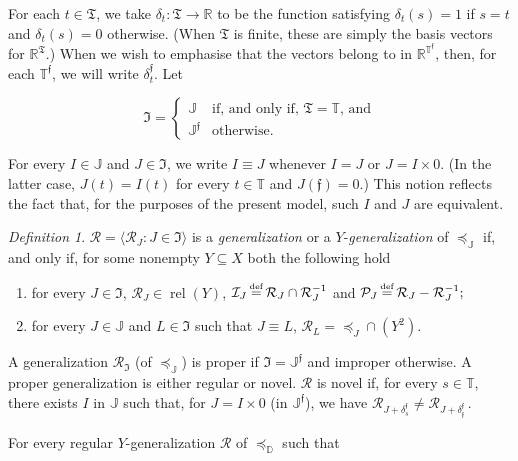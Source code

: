 \documentclass[ecta,nameyear,draft]{econsocart}
\newcommand{\bs}{-}%
\newcommand{\R}{\mathbb R}
\newcommand{\mc}{\mathcal}
\newcommand\defeq{\mathrel{\overset{\makebox[0pt]{\mbox{\normalfont\tiny def}}}{=}}}%
\newcommand{\relations}{\operatorname{rel}}
\newcommand{\novel}{\mathfrak f}
\newcommand{\preceqb}{\mathbin{\preceq}}
\newcommand{\ext}{\mathrel{\mc R}}
\newcommand{\extb}{\mathbin{\mc R}}
\newcommand{\sextb}{\mathbin{\mc P}}
\newcommand{\nextb}{\mathbin{\mc I}}
\newcommand{\mbbd}{{\mathds D}}
\newcommand{\mbbt}{{\mathds {T}}}
\newcommand{\mbbtp}{{\mathds{T}^\novel}}
\newcommand{\mbbtpp}{{\mathfrak{T}}}
\newcommand{\mbbj}{\mathds J}
\newcommand{\mbbjp}{{\mathds {J}^{\novel}}}
\newcommand{\mbbjpp}{\mathfrak{I}}
\theoremstyle{plain}
\theoremstyle{remark}
\newtheorem{definition}{Definition}%
\begin{document}
\begin{appendix}
  For each $t \in \mbbtpp$, we take $\delta_{t} : \mbbtpp \rightarrow \R$ to be
  the function satisfying $\delta_{t} ( s ) = 1$ if $s = t$ and $\delta_{t} (s)
  = 0$ otherwise. (When $\mbbtpp$ is finite, these are simply the basis vectors
  for $\R^{\mbbtpp}$.)  When we wish to emphasise that the vectors belong to in
  $\R^{\mbbtp}$, then, for each $\mbbtp$, we will write $\delta_{t}^{\novel}$.
  Let
  \begin{linenomath*}
    \begin{equation*}
      \text{$\mbbjpp$} = \left \{
        \begin{array}{ll}
          \mbbj & \text{if, and only if, $\mbbtpp = \mbbt$, and} \\
          \mbbjp & \text{otherwise.}
      \end{array}\right.
    \end{equation*}
  \end{linenomath*}
  For every $I \in \mbbj$ and $J \in \mbbjpp$, we write $I \equiv J$ whenever
  $I
  = J$ or $J = I\times 0$. (In the latter case, $J(t)= I(t)$ for every $t\in
  \mbbt$ and $J(\novel )= 0$.) This notion reflects the fact that, for the
  purposes of the present model, such $I$ and $J$ are equivalent.
  \begin{definition}\label{def-{generalization}Q} $\extb =\langle \extb_{J}: J
    \in \mbbjpp \rangle$ is a \emph{{generalization}} or a
    $Y$-\emph{{generalization}} of $\preceqb _{\mbbj}$ if, and only if, for
    some nonempty $Y \subseteq X$ both the following hold
    \begin{enumerate}
      \item for every $J\in \mbbjpp$, $\extb_{J}\in \relations(Y)$, $\nextb_{J}
        \defeq \extb_{J} \cap \extb_{J}^{-1}$ and $\sextb_{J} \defeq \extb_{J}
        \bs \extb_{J}^{-1};$
      \item for every $J \in \mbbj$ and $L \in \mbbjpp$ such that $J \equiv L$,
        $\extb_{L} = \preceqb_{J} \cap (Y^2)$. \label{item-preservingQ}
    \end{enumerate}
    A {generalization} $\ext_{\mbbjpp}$ (of $\preceq_{\mbbj}$) is proper if
    $\mbbjpp= \mbbjp$ and improper otherwise.  A proper {generalization} is
    either regular or novel. $\ext$ is novel if, for every $s \in \mbbt$, there
    exists $I$ in $\mbbj$ such that, for $J = I \times 0$ (in $\mbbjp$), we
    have $\extb _ {J + \delta _{s}^{\novel}} \neq \extb _ {J + \delta _
    {\novel}^{\novel} }$\,.
  \end{definition} 
  For every regular $Y$-{generalization} $\ext$ of $\preceq_{\mbbd}$ such that

\end{appendix}
\end{document}
